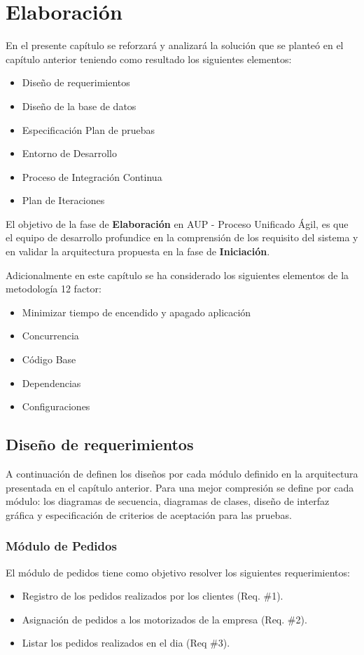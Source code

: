
\chapter{Elaboración}
\noindent En el presente capítulo se reforzará y analizará la solución que se planteó en el capítulo anterior teniendo como resultado los siguientes elementos:

\begin{itemize}
\item Diseño de requerimientos
\item Diseño de la base de datos
\item Especificación Plan de pruebas
\item Entorno de Desarrollo
\item Proceso de Integración Continua
\item Plan de Iteraciones 
\end{itemize}

\noindent El objetivo de la fase de \textbf{Elaboración} en AUP - Proceso Unificado Ágil, es que el equipo de desarrollo profundice en la comprensión de los requisito del sistema y en validar la arquitectura propuesta en la fase de \textbf{Iniciación}.

\noindent Adicionalmente en este capítulo se ha considerado los siguientes elementos de la metodología 12 factor:
\begin{itemize}
\item Minimizar tiempo de encendido y apagado aplicación
\item Concurrencia
\item Código Base
\item Dependencias
\item Configuraciones
\end{itemize}

\section{Diseño de requerimientos}
\noindent A continuación de definen los diseños por cada módulo definido en la arquitectura presentada en el capítulo anterior. Para una mejor compresión se define por cada módulo: los diagramas de secuencia, diagramas de clases, diseño de interfaz gráfica y especificación de criterios de aceptación para las pruebas.

\subsection{Módulo de Pedidos}
\noindent El módulo de pedidos tiene como objetivo resolver los siguientes requerimientos:
\begin{itemize}
\item Registro de los pedidos realizados por los clientes (Req. \#1).
\item Asignación de pedidos a los motorizados de la empresa (Req. \#2).
\item Listar los pedidos realizados en el dia (Req \#3).
\end{itemize}

